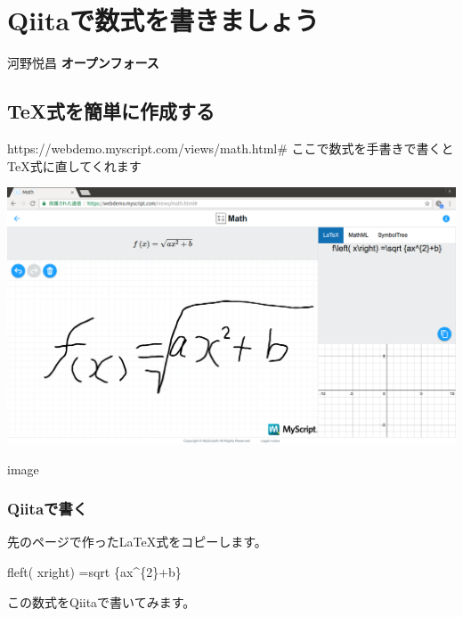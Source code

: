 \chapter{Qiitaで数式を書きましょう}
\label{chap:QiitaFormula}
 \begin{center} 
河野悦昌  \textbf{オープンフォース}

 \end{center} 
\section{TeX式を簡単に作成する}
\label{sec:2-1}

https://webdemo.myscript.com/views/math.html\#
ここで数式を手書きで書くとTeX式に直してくれます

\begin{reviewimage}
\includegraphics[width=\maxwidth]{./images/f7182c75-f4fe-07a4-6d54-c76f5d514db8.png}
\caption{image}
\label{image:QiitaFormula:f7182c75-f4fe-07a4-6d54-c76f5d514db8}
\end{reviewimage}

\subsection*{Qiitaで書く}
\label{sec:2-1-1}

先のページで作ったLaTeX式をコピーします。

\begin{reviewemlist}
f\reviewbackslash{}left( x\reviewbackslash{}right) =\reviewbackslash{}sqrt \{ax\textasciicircum{}\{2\}+b\}


\end{reviewemlist}

この数式をQiitaで書いてみます。

